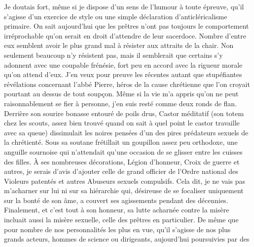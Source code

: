 Je doutais fort, même si je dispose d’un sens de l’humour à toute épreuve, qu’il s’agisse d’un exercice de style ou une simple déclaration d’anticléricalisme primaire. \label{rat:8}On sait aujourd’hui que les prêtres n’ont pas toujours le comportement irréprochable qu’on serait en droit d’attendre de leur sacerdoce. Nombre d’entre eux semblent avoir le plus grand mal à résister aux attraits de la chair. Non seulement beaucoup n’y résistent pas, mais il semblerait que certains s’y adonnent avec une coupable frénésie, fort peu en accord avec la rigueur morale qu’on attend d’eux. J’en veux pour preuve les récentes autant que stupéfiantes révélations concernant l’abbé Pierre, héros de la cause chrétienne que l’on croyait pourtant au dessus de tout soupçon. Même si la vie m’a appris qu’on ne peut raisonnablement se fier à personne, j’en suis resté comme deux ronds de flan. Derrière son sourire bonasse entouré de poils drus, Castor méditatif (son totem chez les scouts, assez bien trouvé quand on sait à quel point le castor travaille avec sa queue) dissimulait les noires pensées d’un des pires prédateurs sexuels de la chrétienté. Sous sa soutane frétillait un goupillon assez peu orthodoxe, une anguille sournoise qui n’attendait qu’une occasion de se glisser entre les cuisses des filles. À ses nombreuses décorations, Légion d’honneur, Croix de guerre et autres, je serais d’avis d’ajouter celle de grand officier de l’Ordre national des Violeurs patentés et autres Abuseurs sexuels compulsifs. Cela dit, je ne vais pas m’acharner sur lui ni sur sa hiérarchie qui, désireuse de se focaliser uniquement sur la bonté de son âme, a couvert ses agissements pendant des décennies. Finalement, et c’est tout à son honneur, sa lutte acharnée contre la misère incluait aussi la misère sexuelle, celle des prêtres en particulier. De même que pour nombre de nos personnalités les plus en vue, qu’il s’agisse de nos plus grands acteurs, hommes de science ou dirigeants, aujourd’hui poursuivies par des 